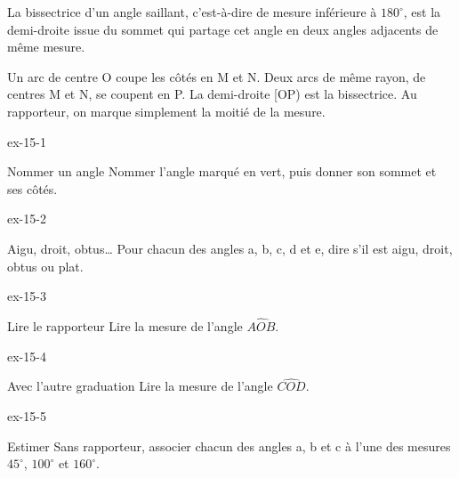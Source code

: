 \begin{definition}La bissectrice d’un angle saillant, c’est-à-dire de mesure inférieure à $180^\circ$, est la demi-droite issue du sommet qui partage cet angle en deux angles adjacents de même mesure.\end{definition}
\begin{savoirfaire}[Au compas]Un arc de centre O coupe les côtés en M et N. Deux arcs de même rayon, de centres M et N, se coupent en P. La demi-droite [OP) est la bissectrice. Au rapporteur, on marque simplement la moitié de la mesure.\end{savoirfaire}

\clearpage{}
\begin{blocLivre}{ex-15-1}\begin{exercice}[1]{Nommer un angle}
Nommer l’angle marqué en vert, puis donner son sommet et ses côtés.
\label{fig-ex-15-1}
\end{exercice}\end{blocLivre}
\begin{blocLivre}{ex-15-2}\begin{exercice}[1]{Aigu, droit, obtus…}
Pour chacun des angles a, b, c, d et e, dire s’il est aigu, droit, obtus ou plat.
\label{fig-ex-15-2}
\end{exercice}\end{blocLivre}
\begin{blocLivre}{ex-15-3}\begin{exercice}[1]{Lire le rapporteur}
Lire la mesure de l’angle $\widehat{AOB}$.
\label{fig-ex-15-3}
\end{exercice}\end{blocLivre}
\begin{blocLivre}{ex-15-4}\begin{exercice}[1]{Avec l’autre graduation}
Lire la mesure de l’angle $\widehat{COD}$.
\label{fig-ex-15-4}
\end{exercice}\end{blocLivre}
\begin{blocLivre}{ex-15-5}\begin{exercice}[1]{Estimer}
Sans rapporteur, associer chacun des angles a, b et c à l’une des mesures $45^\circ$, $100^\circ$ et $160^\circ$.
\label{fig-ex-15-5}
\end{exercice}\end{blocLivre}

